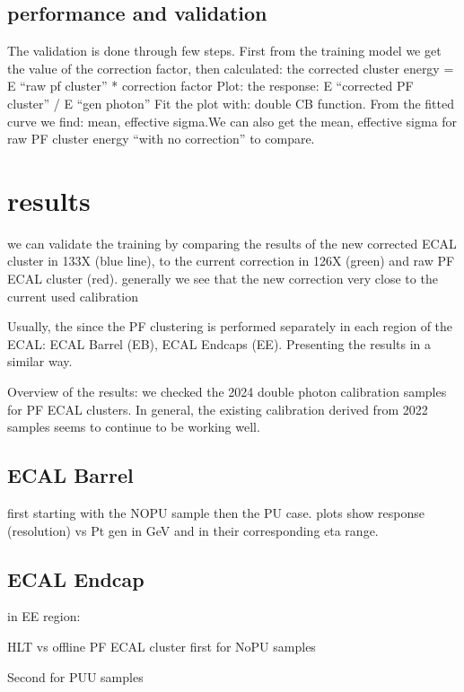 \subsection{performance and validation}
The validation is done through few steps. First from the training model we get the value of the correction factor, then  calculated:  the corrected cluster energy = E “raw pf cluster” * correction factor Plot: the response: E “corrected PF cluster” / E “gen photon” Fit the plot with: double CB function. From the fitted curve we find: mean, effective sigma.We can also get the mean, effective sigma for raw PF cluster energy “with no correction” to compare.
 
\section{results}

we can validate the training by comparing the results of the new corrected ECAL cluster in 133X (blue line), to the current  correction in 126X (green) and  raw PF ECAL cluster (red).
generally we see that the new  correction very close to the current used calibration

Usually, the since the PF clustering is performed separately in each region of the ECAL: ECAL Barrel (EB), ECAL Endcaps (EE).
Presenting the results in a similar way.

Overview of the results: we checked the 2024 double photon calibration samples for PF ECAL clusters. In general, the existing calibration derived from 2022 samples seems to continue to be working well.

\subsection{ECAL Barrel}
first starting with the NOPU sample then the PU case.
plots show response (resolution) vs Pt gen in GeV and in their corresponding eta range.





\subsection{ECAL Endcap}
in EE region:





HLT vs offline PF ECAL cluster
first for NoPU samples

Second for PUU samples

